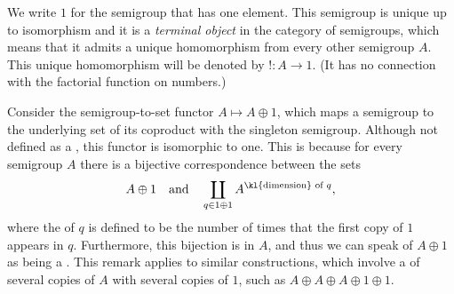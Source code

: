We write $1$ for the semigroup that has one element. This semigroup is unique up to isomorphism and it is a \emph{terminal object} in the category of semigroups, which means that it admits a unique homomorphism from every other semigroup $A$. This unique homomorphism will be denoted by $!\colon A \to 1$. (It has no connection with the factorial function on numbers.)

\begin{remark}
    \label{rem:coproduct-as-polynomial-functor}
    Consider the semigroup-to-set functor $A \mapsto A \oplus 1$, which maps a semigroup to the underlying set of its coproduct with the singleton semigroup. Although not defined as a , this functor is isomorphic to one. This is because for every semigroup $A$ there is a bijective correspondence between the sets
    \begin{align*}%
    A \oplus 1 \quad \text{and} \quad \coprod_{q \in 1 \oplus 1} A^{\text{\kl{dimension} of $q$}},
    \end{align*}
    where the  of $q$ is defined to be the number of times that the first copy of $1$ appears in $q$. Furthermore, this bijection is  in $A$, and thus we can speak of $A \oplus 1$ as being a . This remark applies to similar constructions, which involve a  of several copies of $A$ with several copies of $1$, such as $A \oplus A \oplus A \oplus 1 \oplus 1$.
\end{remark}







